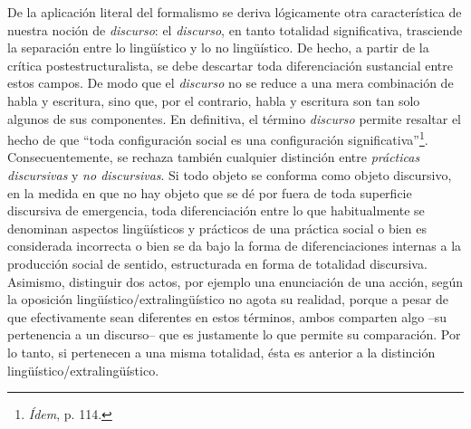 De la aplicación literal del formalismo se deriva lógicamente otra
característica de nuestra noción de \emph{discurso}: el \emph{discurso},
en tanto totalidad significativa, trasciende la separación entre lo
lingüístico y lo no lingüístico. De hecho, a partir de la crítica
postestructuralista, se debe descartar toda diferenciación sustancial
entre estos campos. De modo que el \emph{discurso} no se reduce a una
mera combinación de habla y escritura, sino que, por el contrario, habla
y escritura son tan solo algunos de sus componentes. En definitiva, el
término \emph{discurso} permite resaltar el hecho de que \enquote{toda
configuración social es una configuración significativa}\footnote{\emph{Ídem},
  p. 114.}. Consecuentemente, se rechaza también cualquier distinción
entre \emph{prácticas discursivas} y \emph{no discursivas}. Si todo
objeto se conforma como objeto discursivo, en la medida en que no hay
objeto que se dé por fuera de toda superficie discursiva de emergencia,
toda diferenciación entre lo que habitualmente se denominan aspectos
lingüísticos y prácticos de una práctica social o bien es considerada
incorrecta o bien se da bajo la forma de diferenciaciones internas a la
producción social de sentido, estructurada en forma de totalidad
discursiva. Asimismo, distinguir dos actos, por ejemplo una enunciación
de una acción, según la oposición lingüístico/extralingüístico no agota
su realidad, porque a pesar de que efectivamente sean diferentes en
estos términos, ambos comparten algo --su pertenencia a un discurso--
que es justamente lo que permite su comparación. Por lo tanto, si
pertenecen a una misma totalidad, ésta es anterior a la distinción
lingüístico/extralingüístico.

